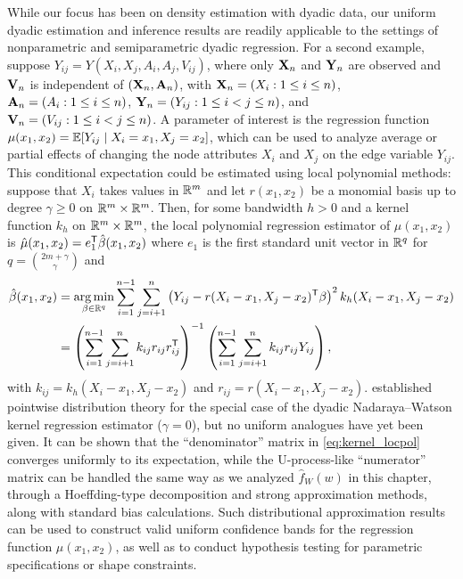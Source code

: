 While our focus has been on density estimation with dyadic data,
our uniform dyadic estimation and inference results are readily applicable
to the settings of nonparametric and semiparametric dyadic regression.
For a second example, suppose $Y_{i j} = Y(X_i, X_j, A_i, A_j, V_{i j})$,
where only $\mathbf{X}_n$ and $\mathbf{Y}_n$ are observed and
$\mathbf{V}_n$ is independent of $(\mathbf{X}_n, \mathbf{A}_n)$,
with $\mathbf{X}_n = (X_i : 1 \leq i \leq n)$,
$\mathbf{A}_n = (A_i : 1 \leq i \leq n)$, $\mathbf{Y}_n = (Y_{i j}:1\leq i<j\leq n)$,
and $\mathbf{V}_n = (V_{i j} : 1 \leq i < j \leq n)$.
A parameter of interest is the regression function
$\mu(x_1, x_2) = \mathbb{E}[Y_{i j} \mid X_i=x_1, X_j=x_2]$,
which can be used to analyze average or partial effects
of changing the node attributes $X_i$ and $X_j$ on the edge variable $Y_{i j}$.
This conditional expectation could be estimated using local polynomial methods:
suppose that $X_i$ takes values in $\mathbb{R}^m$ and
let $r(x_1, x_2)$ be a monomial basis up to degree
$\gamma \geq 0$ on $\mathbb{R}^m \times \mathbb{R}^m$. Then, for some bandwidth $h > 0$ and
a kernel function $k_h$ on $\mathbb{R}^m \times \mathbb{R}^m$,
the local polynomial regression estimator of $\mu(x_1, x_2)$ is
$\hat\mu(x_1, x_2) = e_1^{\mathsf{T}} \hat\beta(x_1, x_2)$ where
$e_1$ is the first standard unit vector in $\mathbb{R}^q$ for
$q=\binom{2m+\gamma}{\gamma}$ and
%
\begin{align}
  \nonumber
  \hat{\beta}(x_1, x_2)
  &=
  \operatorname*{arg\,min}_{\beta \in \mathbb{R}^q}
  \sum_{i=1}^{n-1} \sum_{j=i+1}^n
  \left( Y_{i j} - r(X_i-x_1, X_j-x_2)^{\mathsf{T}} \beta \right)^2
  k_h(X_i-x_1, X_j-x_2) \\
  \label{eq:kernel_locpol}
  &=
  \left(
    \sum_{i=1}^{n-1} \sum_{j=i+1}^n k_{i j} r_{i j} r_{i j}^{\mathsf{T}}
  \right)^{-1}
  \left(
    \sum_{i=1}^{n-1} \sum_{j=i+1}^n k_{i j} r_{i j} Y_{i j}
  \right),
\end{align}
%
with $k_{i j} = k_h(X_i-x_1, X_j-x_2)$ and $r_{i j} = r(X_i-x_1, X_j-x_2)$.
\citet{graham2021minimax} established pointwise distribution theory
for the special case of the dyadic Nadaraya--Watson kernel regression estimator
($\gamma=0$), but no uniform analogues have yet been given. It can be shown
that the ``denominator'' matrix in \eqref{eq:kernel_locpol} converges uniformly
to its
expectation, while the U-process-like ``numerator'' matrix can be handled the
same way as we analyzed $\hat f_W(w)$ in this chapter, through a Hoeffding-type
decomposition and strong approximation methods, along with standard bias
calculations. Such distributional approximation results can be used to
construct valid uniform confidence bands for the regression function
$\mu(x_1, x_2)$, as well as to conduct hypothesis testing for parametric
specifications or shape constraints.

